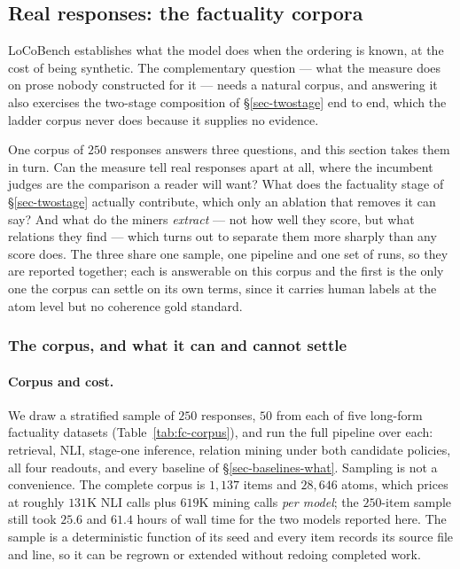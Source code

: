 \subsection{Real responses: the factuality corpora}
\label{sec-factuality-corpora}\label{sec-ablation}\label{sec-relation-inventory}

LoCoBench establishes what the model does when the ordering is known, at the cost of being
synthetic. The complementary question --- what the measure does on prose nobody constructed for it
--- needs a natural corpus, and answering it also exercises the two-stage composition of
\S\ref{sec-twostage} end to end, which the ladder corpus never does because it supplies no evidence.

One corpus of $250$ responses answers three questions, and this section takes them in turn. Can the
measure tell real responses apart at all, where the incumbent judges are the comparison a reader will
want? What does the factuality stage of \S\ref{sec-twostage} actually contribute, which only an
ablation that removes it can say? And what do the miners \emph{extract} --- not how well they score,
but what relations they find --- which turns out to separate them more sharply than any score does.
The three share one sample, one pipeline and one set of runs, so they are reported together; each is
answerable on this corpus and the first is the only one the corpus can settle on its own terms, since
it carries human labels at the atom level but no coherence gold standard.

\subsubsection*{The corpus, and what it can and cannot settle}

\paragraph{Corpus and cost.} We draw a stratified sample of $250$ responses, $50$ from each of five
long-form factuality datasets (Table~\ref{tab:fc-corpus}), and run the full pipeline over each:
retrieval, NLI, stage-one inference, relation mining under both candidate policies, all four
readouts, and every baseline of \S\ref{sec-baselines-what}. Sampling is not a convenience. The
complete corpus is $1{,}137$ items and $28{,}646$ atoms, which prices at roughly $131$K NLI calls
plus $619$K mining calls \emph{per model}; the $250$-item sample still took $25.6$ and $61.4$ hours
of wall time for the two models reported here. The sample is a deterministic function of its seed and
every item records its source file and line, so it can be regrown or extended without redoing
completed work.

